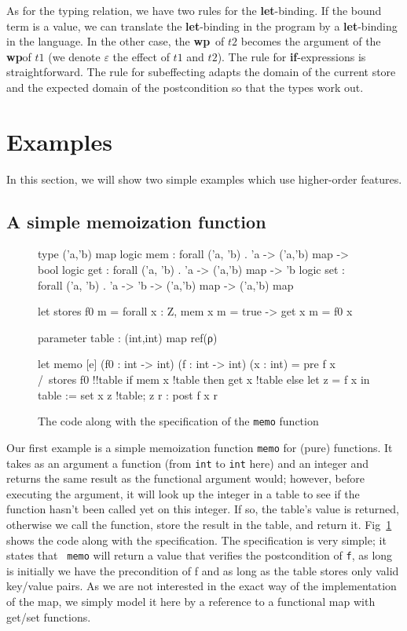 \documentclass[a4paper]{llncs}
\newcommand{\wpre}{{\bf wp}}
\newcommand{\letml}{{\bf let}}
\newcommand{\ifml}{{\bf if}}
\begin{document}
As for the typing relation, we have two rules for the \letml-binding. If the
bound term is a value, we can translate the \letml-binding in the program by a
\letml-binding in the language. In the other case, the \wpre\ of $ t2 $ becomes
the argument of the \wpre of $ t1 $ (we denote $ε$ the effect of $ t1 $ and $
t2 $). The rule for \ifml-expressions is straightforward. The rule for
subeffecting adapts the domain of the current store and the expected domain of
the postcondition so that the types work out.

\section{Examples}
\label{sec:examples}

In this section, we will show two simple examples which use higher-order
features.

\subsection{A simple memoization function}

\begin{figure}[tpb]
\begin{who}
type ('a,'b) map
logic mem : forall ('a, 'b) . 'a -> ('a,'b) map -> bool
logic get : forall ('a, 'b) . 'a -> ('a,'b) map -> 'b
logic set : forall ('a, 'b) . 'a -> 'b -> ('a,'b) map -> ('a,'b) map

let stores f0 m =
  forall x : Z, mem x m = true -> get x m = f0 x

parameter table : (int,int) map ref(ρ)

let memo [e] (f0 : int -> int) (f : int ->{} int) (x : int) = 
  {pre f x /\ stores f0 !!table}
  if mem x !table then get x !table
  else
    let z = f x in
    table := set x z !table;
    z
  {r : post f x r}
\end{who}
  \caption{The code along with the specification of the {\tt memo} function}
  \label{fig:memo}
\end{figure}

Our first example is a simple memoization function {\tt memo} for (pure)
functions.  It takes as an argument a function (from {\tt int} to {\tt int}
here) and an integer and returns the same result as the functional argument
would; however, before executing the argument, it will look up the integer in
a table to see if the function hasn't been called yet on this integer. If so,
the table's value is returned, otherwise we call the function, store the
result in the table, and return it. Fig~\ref{fig:memo} shows the code along
with the specification. The specification is very simple; it states that {\tt
memo} will return a value that verifies the postcondition of {\tt f}, as long
is initially we have the precondition of f and as long as the table stores
only valid key/value pairs. As we are not interested in the exact way of the
implementation of the map, we simply model it here by a reference to a
functional map with get/set functions.
\end{document}
